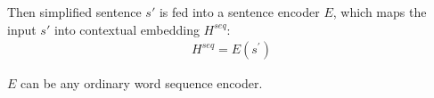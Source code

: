 Then simplified sentence $s'$ is fed into a sentence encoder $E$,
which maps the input $s'$ into contextual embedding $H^{seq}$:
\begin{equation}
\begin{aligned}
 H^{seq} = E\left(s^{'}\right)
\end{aligned}
\end{equation}
\noindent

$E$ can be any 
ordinary word sequence encoder.






